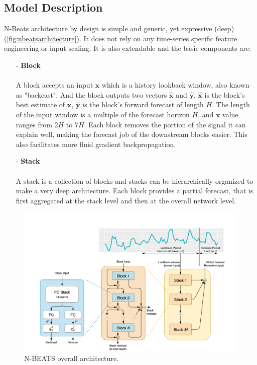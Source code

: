 \documentclass{article}
\newcommand{\vect}[1]{\bm{#1}} %
\begin{document}
\subsection{Model Description}
N-Beats architecture by design is simple and generic, yet expressive (deep)  (\autoref{fig:nbeatsarchitecture}). It does not rely on any time-series specific feature engineering or input scaling.
It is also extendable and the basic components are:
\begin{itemize}
 	\item[-]  \textbf{Block}
 	\paragraph{} A block accepts an input $\vect{x}$ which is a history lookback window, also known as "backcast". And the block outputs two vectors $\hat{\vect{x}}$ and $\hat{\vect{y}}$,  $\hat{\vect{x}}$ is the block's best estimate
	of $\vect{x}$, $\hat{\vect{y}}$ is the block's forward forecast of length $H$. The length of the input window is a multiple of the forecast horizon $H$, and $\vect{x}$ value ranges from 2$H$ to 7$H$. Each block removes the portion of the signal
	it can explain well, making the forecast job of the downstream blocks easier.  This also facilitates more fluid gradient backpropagation.
	\item[-]  \textbf{Stack}
	\paragraph{} A stack is a collection of blocks and stacks can be hierarchically organized to make a very deep architecture. Each block provides a partial forecast, that is first aggregated at the stack level and then at the overall network level.
 \end{itemize}

\begin{figure}[!ht]
\centering
	\includegraphics[width=0.6\columnwidth]{n-beats_stack.png} 
\caption{N-BEATS overall architecture.}
\label{fig:nbeatsarchitecture}
\end{figure}
\end{document}
